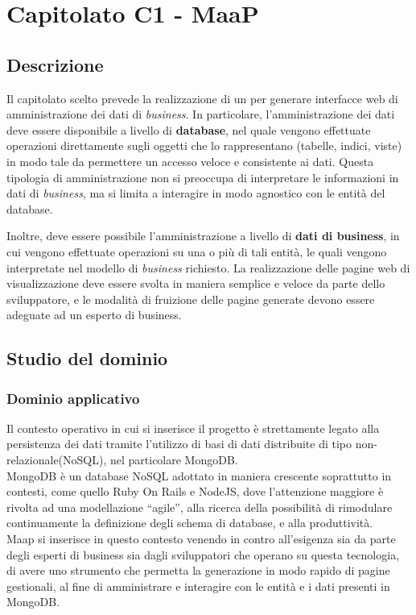 \section{Capitolato C1 - MaaP}

\subsection{Descrizione}
Il capitolato scelto prevede la realizzazione di un  per generare interfacce web di amministrazione dei dati di \emph{business}. In particolare, l'amministrazione dei dati deve essere disponibile a livello di \textbf{database}, nel quale vengono effettuate operazioni direttamente sugli oggetti che lo rappresentano (tabelle, indici, viste) in modo tale da permettere un accesso veloce e consistente ai dati. Questa tipologia di amministrazione non si preoccupa di interpretare le informazioni in dati di \emph{business}, ma si limita a interagire in modo agnostico con le entità del database.

Inoltre, deve essere possibile l'amministrazione a livello di \textbf{dati di business}, in cui vengono effettuate operazioni su una o più di tali entità, le quali vengono interpretate nel modello di \emph{business} richiesto. La realizzazione delle pagine web di visualizzazione deve essere svolta in maniera semplice e veloce da parte dello sviluppatore, e le modalità di fruizione delle pagine generate devono essere adeguate ad un esperto di business.

\subsection{Studio del dominio}

        \subsubsection{Dominio applicativo}
        Il contesto operativo in cui si inserisce il progetto è strettamente legato alla persistenza dei dati tramite l'utilizzo di basi di dati distribuite di tipo non-relazionale(NoSQL), nel particolare MongoDB.\\
        MongoDB è un database NoSQL adottato in maniera crescente soprattutto in contesti, come quello Ruby On Rails e NodeJS, dove l’attenzione maggiore è rivolta ad una modellazione “agile”, alla ricerca della possibilità di rimodulare continuamente la definizione degli schema di database, e alla produttività.\\
        Maap si inserisce in questo contesto venendo in contro all'esigenza sia da parte degli esperti di business sia dagli sviluppatori che operano su questa tecnologia, di avere uno strumento che permetta la generazione in modo rapido di pagine gestionali, al fine di amministrare e interagire con le entità e i dati presenti in MongoDB.
        
